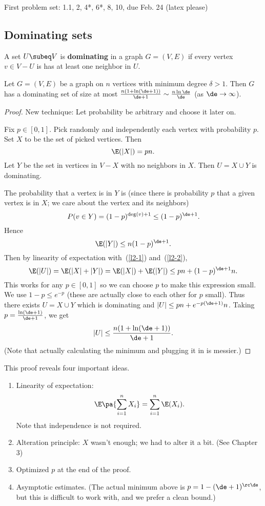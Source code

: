 
First problem set: 1.1, 2, 4*, 6*, 8, 10, due Feb. 24 (latex please)

\subsection{Dominating sets}

\begin{df}
A set $U\subeq V$ is \textbf{dominating} in a graph $G=(V,E)$ if every vertex $v\in V-U$ %
is has at least one neighbor in $U$.
\end{df}
\begin{thm}
Let $G=(V,E)$ be a graph on $n$ vertices with minimum degree $\delta>1$. Then $G$ has a dominating set of size at most $\frac
{n(1+\ln(\de+1))}
{\de+1}
\sim \frac{n\ln \de}{\de}$ (as $\de\to \infty$).
\end{thm}
\begin{proof}
New technique: Let probability be arbitrary and choose it later on.

Fix $p\in [0,1]$. Pick randomly and independently each vertex with probability $p$. Set $X$ to be the set of picked vertices. Then
\begin{equation}\label{l2-1}
\E(|X|)=pn.\end{equation}
Let $Y$ be the set in vertices in $V-X$ with no neighbors in $X$. Then $U=X\cup Y$ is dominating.

The probability that a vertex is in $Y$ is (since there is probability $p$ that a given vertex is in $X$; we care about the vertex and its neighbors)
\[
P(v\in Y)=(1-p)^{\deg(v)+1}\leq (1-p)^{\de+1}.
\]
Hence
\begin{equation}\label{l2-2}
\E(|Y|)\leq n(1-p)^{\de+1}.
\end{equation}
Then by linearity of expectation with~(\ref{l2-1}) and~(\ref{l2-2}),
\[
\E(|U|)=\E(|X|+|Y|)=\E(|X|)+\E(|Y|)\leq pn+(1-p)^{\de+1}n.
\]
This works for any $p\in [0,1]$ so we can choose $p$ to make this expression small. We use $1-p\leq e^{-p}$ (these are actually close to each other for $p$ small). Thus there exists $U=X\cup Y$ which is dominating and $|U|\leq pn+e^{-p(\de+1)}n$. Taking $p=\frac{\ln(\de+1)}{\de+1}$, we get
\[
|U|\leq \frac{n(1+\ln(\de+1))}{\de+1}.
\]
(Note that actually calculating the minimum and plugging it in is messier.)
\end{proof}

This proof reveals four important ideas.
\begin{enumerate}
\item
Linearity of expectation:
\[\E\pa{\sum_{i=1}^n X_i}=\sum_{i=1}^n \E(X_i).\]
Note that independence is not required.
\item Alteration principle: $X$ wasn't enough; we had to alter it a bit. (See Chapter 3)
\item Optimized $p$ at the end of the proof.
\item Asymptotic estimates. (The actual minimum above is $p=1-(\de+1)^{\rc \de}$, but this is difficult to work with, and we prefer a clean bound.)
\end{enumerate}

